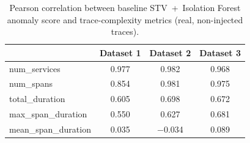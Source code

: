 \begin{table}[t]
\centering
\caption{Pearson correlation between baseline STV~+~Isolation Forest anomaly
score and trace-complexity metrics (real, non-injected traces).}
\label{tab:complexity-bias-baseline}
\begin{tabular}{lccc}
\toprule
& \textbf{Dataset 1} & \textbf{Dataset 2} & \textbf{Dataset 3} \\
\midrule
num\_services      & 0.977 & 0.982 & 0.968 \\
num\_spans         & 0.854 & 0.981 & 0.975 \\
total\_duration    & 0.605 & 0.698 & 0.672 \\
max\_span\_duration & 0.550 & 0.627 & 0.681 \\
mean\_span\_duration & 0.035 & $-$0.034 & 0.089 \\
\bottomrule
\end{tabular}
\end{table}
